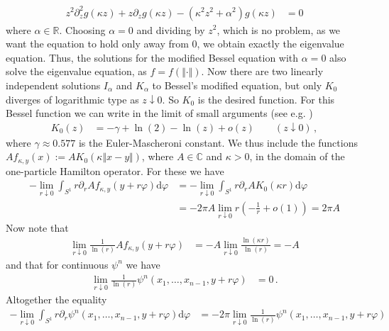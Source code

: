 \begin{align*}
  z^{2}
  \partial_{z}^{2}
  g(\kappa z)
  +
  z
  \partial_{z}
  g(\kappa z)
  -
  \left(
    \kappa^{2}
    z^{2}
    +
    \alpha^{2}
  \right)
  g(\kappa z)
  &=
  0
\end{align*}
where $\alpha \in \mathbb{R}$. Choosing $\alpha = 0$ and dividing by $z^{2}$, which is no problem, as we want the equation to hold only away from $0$, we obtain exactly the eigenvalue equation. Thus, the solutions for the modified Bessel equation with $\alpha = 0$ also solve the eigenvalue equation, as $f = f(\Vert \cdot \Vert)$. Now there are two linearly independent solutions $I_{\alpha}$ and $K_{\alpha}$ to Bessel's modified equation, but only $K_{0}$ diverges of logarithmic type as $z \downarrow 0$. So $K_{0}$ is the desired function. For this Bessel function we can write in the limit of small arguments (see e.g. \cite{69346099})
\begin{align*}
  K_{0}(z)
  &=
  -
  \gamma
  +
  \ln(2)
  -
  \ln(z)
  +
  o(z)
  \qquad
  (z \downarrow 0)
  \,,
\end{align*}
where $\gamma \approx 0.577$ is the Euler-Mascheroni constant. We thus include the functions $Af_{\kappa,y}(x) := AK_{0}(\kappa\Vert x - y \Vert)$, where $A \in \mathbb{C}$ and $\kappa > 0$, in the domain of the one-particle Hamilton operator. For these we have
\begin{align*}
  -
  \lim_{r \downarrow 0}
  \int_{S^{1}}
  r
  \partial_{r}
  A
  f_{\kappa,y}(y + r\varphi)
  \mathrm{d}\varphi
  &=
  -
  \lim_{r \downarrow 0}
  \int_{S^{1}}
  r
  \partial_{r}
  A
  K_{0}(\kappa r)
  \mathrm{d}\varphi
  \\
  &=
  -
  2\pi
  A
  \lim_{r \downarrow 0}
  r
  \left(
    -
    \frac{1}{r}
    +
    o(1)
  \right)
  =
  2\pi
  A
\end{align*}
Now note that
\begin{align*}
  \lim_{r \downarrow 0}
  \frac{1}{\ln(r)}
  A
  f_{\kappa,y}(y + r\varphi)
  &=
  -
  A
  \lim_{r \downarrow 0}
  \frac{\ln(\kappa r)}{\ln(r)}
  =
  -
  A
\end{align*}
and that for continuous $\psi^{n}$ we have
\begin{align*}
  \lim_{r \downarrow 0}
  \frac{1}{\ln(r)}
  \psi^{n}
  \left(
    x_{1}
    ,
    \dots
    ,
    x_{n-1}
    ,
    y
    +
    r\varphi
  \right)
  &=
  0
  \,.
\end{align*}
Altogether the equality
\begin{align*}
  -
  \lim_{r \downarrow 0}
  \int_{S^{1}}
  r
  \partial_{r}
  \psi^{n}
  \left(
    x_{1}
    ,
    \dots
    ,
    x_{n-1}
    ,
    y
    +
    r
    \varphi
  \right)
  \mathrm{d}\varphi
  &=
  -
  2\pi
  \lim_{r \downarrow 0}
  \frac{1}{\ln(r)}
  \psi^{n}
  \left(
    x_{1}
    ,
    \dots
    ,
    x_{n-1}
    ,
    y
    +
    r\varphi
  \right)
\end{align*}
